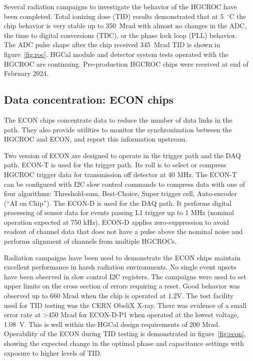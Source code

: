 \documentclass[twocolumn]{webofc}
\begin{document}
Several radiation campaigns to investigate the behavior of the HGCROC have been completed. Total ionizing dose (TID) results demonstrated that at 5~$^{\circ}$C the chip behavior is very stable up to 350~Mrad  with almost no changes in the ADC, the time to digital conversions (TDC), or the phase lock loop (PLL) behavior. The ADC pulse shape after the chip received 345~Mrad TID is shown in figure~\ref{fig:roc}. HGCal module and detector system tests operated with the HGCROC are continuing. Pre-production HGCROC chips were received at end of February 2024.

\subsection{Data concentration: ECON chips}
\label{sec:econ}
The ECON chips concentrate data to reduce the number of data links in the path. They also provide utilities to monitor the synchronization between the HGCROC and ECON, and report this information upstream.

Two version of ECON are designed to operate in the trigger path and the DAQ path. ECON-T is used for the trigger path. Its roll is to select or compress HGCROC trigger data for transmission off detector at 40 MHz. The ECON-T can be configured with I2C slow control commands to compress data with one of four algorithms: Threshold-sum, Best-Choice, Super trigger cell, Auto-encoder (“AI on Chip”). The ECON-D is used for the DAQ path. It performs digital processing of sensor data for events passing L1 trigger up to 1 MHz (nominal operation expected at 750 kHz). ECON-D applies zero-suppression to avoid readout of channel data that does not have a pulse above the nominal noise and performs alignment of channels from multiple HGCROCs.

Radiation campaigns have been used to demonstrate the ECON chips maintain excellent performance in harsh radiation environments. No single event upsets have been observed in slow control I2C registers. The campaigns were used to set upper limits on the cross section of errors requiring a reset. Good behavior was observed up to 660 Mrad when the chip is operated at 1.2V. The test facility used for TID testing was the CERN ObeliX X-ray. There was evidence of a small error rate at >450 Mrad for ECON-D-P1 when operated at the lowest voltage, 1.08~V. This is well within the HGCal design requirements of 200 Mrad. Operability of the ECON during TID testing is demonstrated in figure~\ref{fig:econ}, showing the expected change in the optimal phase and capacitance settings with exposure to higher levels of TID.
\end{document}
